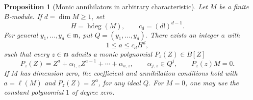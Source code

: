 \documentclass[11pt,reqno]{amsart}
\numberwithin{equation}{section}
\newtheorem{proposition}[theorem]{Proposition}
\theoremstyle{definition}
\newcommand{\m}{\mathfrak m}
\newcommand{\hdeg}{\operatorname{hdeg}}
\begin{document}
\begin{proposition}[Monic annihilators in arbitrary characteristic]
\label{prop:monic-module-annihilator}
Let $M$ be a finite $B$-module. If $d=\dim M\geq1$, set
\[
 H=\hdeg(M),\qquad c_d=(d!)^{d-1}.
\]
For general $y_1,\ldots,y_d\in\m$, put $Q=(y_1,\ldots,y_d)$.
There exists an integer $a$ with
\[
 1\leq a\leq c_dH^d,
\]
such that every $z\in\m$ admits a monic polynomial $P_z(Z)\in B[Z]$
\begin{equation}
 P_z(Z)=Z^a+\alpha_{1,z}Z^{a-1}+\cdots+\alpha_{a,z},
 \qquad \alpha_{j,z}\in Q^j,
 \qquad P_z(z)M=0.
 \label{eq:monic-module-annihilator}
\end{equation}
If $M$ has dimension zero, the coefficient and annihilation conditions
hold with $a=\ell(M)$ and $P_z(Z)=Z^a$, for any ideal $Q$.
For $M=0$, one may use the constant polynomial $1$ of degree zero.
\end{proposition}
\end{document}
